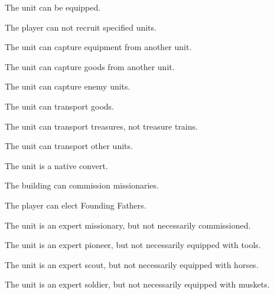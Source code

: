 \documentclass[12pt]{book}
\begin{document}
The unit can be equipped.

\affectsPlayer

The player can not recruit specified units.

\affectsUnit

The unit can capture equipment from another unit.

\affectsUnit

The unit can capture goods from another unit.

\affectsUnit

The unit can capture enemy units.

\affectsUnit

The unit can transport goods.

\affectsUnit

The unit can transport treasures, not treasure trains.

\affectsUnit

The unit can transport other units.

\affectsUnit

The unit is a native convert.

\affectsBuilding

The building can commission missionaries.

\affectsPlayer

The player can elect Founding Fathers.

\affectsUnit

The unit is an expert missionary, but not necessarily commissioned.

\affectsUnit

The unit is an expert pioneer, but not necessarily equipped with tools.

\affectsUnit

The unit is an expert scout, but not necessarily equipped with horses.

\affectsUnit

The unit is an expert soldier, but not necessarily equipped with muskets.
\end{document}
